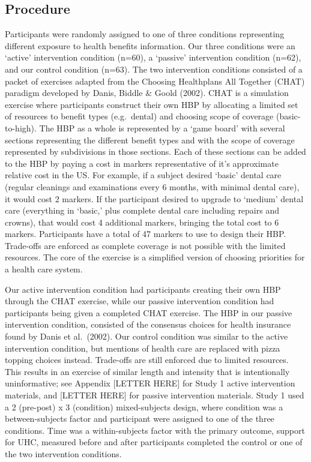 \documentclass[
  english,
  man]{apa6}
\begin{document}
\hypertarget{procedure}{%
\subsection{Procedure}\label{procedure}}

Participants were randomly assigned to one of three conditions representing different exposure to health benefits information. Our three conditions were an `active' intervention condition (n=60), a `passive' intervention condition (n=62), and our control condition (n=63). The two intervention conditions consisted of a packet of exercises adapted from the Choosing Healthplans All Together (CHAT) paradigm developed by Danis, Biddle \& Goold (2002). CHAT is a simulation exercise where participants construct their own HBP by allocating a limited set of resources to benefit types (e.g.~dental) and choosing scope of coverage (basic-to-high). The HBP as a whole is represented by a `game board' with several sections representing the different benefit types and with the scope of coverage represented by subdivisions in those sections. Each of these sections can be added to the HBP by paying a cost in markers representative of it's approximate relative cost in the US. For example, if a subject desired `basic' dental care (regular cleanings and examinations every 6 months, with minimal dental care), it would cost 2 markers. If the participant desired to upgrade to `medium' dental care (everything in `basic,' plus complete dental care including repairs and crowns), that would cost 4 additional markers, bringing the total cost to 6 markers. Participants have a total of 47 markers to use to design their HBP. Trade-offs are enforced as complete coverage is not possible with the limited resources. The core of the exercise is a simplified version of choosing priorities for a health care system.

Our active intervention condition had participants creating their own HBP through the CHAT exercise, while our passive intervention condition had participants being given a completed CHAT exercise. The HBP in our passive intervention condition, consisted of the consensus choices for health insurance found by Danis et al.~(2002). Our control condition was similar to the active intervention condition, but mentions of health care are replaced with pizza topping choices instead. Trade-offs are still enforced due to limited resources. This results in an exercise of similar length and intensity that is intentionally uninformative; see Appendix {[}LETTER HERE{]} for Study 1 active intervention materials, and {[}LETTER HERE{]} for passive intervention materials. Study 1 used a 2 (pre-post) x 3 (condition) mixed-subjects design, where condition was a between-subjects factor and participant were assigned to one of the three conditions. Time was a within-subjects factor with the primary outcome, support for UHC, measured before and after participants completed the control or one of the two intervention conditions.
\end{document}

